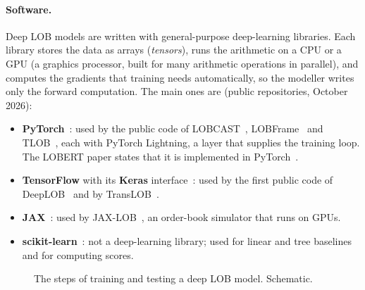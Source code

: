 \paragraph{Software.} Deep LOB models are written with general-purpose deep-learning libraries. Each library
stores the data as arrays (\emph{tensors}), runs the arithmetic on a CPU or a GPU (a graphics processor, built for many arithmetic operations in parallel), and computes the gradients that
training needs automatically, so the modeller writes only the forward computation. The main ones are
(public repositories, October 2026):
\begin{itemize}[leftmargin=1.5em,itemsep=1pt]
\item \textbf{PyTorch}~\citep{paszke2019pytorch}: used by the public code of LOBCAST~\citep{prata2024},
  LOBFrame~\citep{briola2024} and TLOB~\citep{berti2025tlob}, each with PyTorch Lightning, a layer that supplies the
  training loop. The LOBERT paper states that it is implemented in PyTorch~\citep{linna2025lobert}.
\item \textbf{TensorFlow} with its \textbf{Keras} interface~\citep{abadi2016tensorflow,chollet2015keras}: used by the
  first public code of DeepLOB~\citep{zhang2019} and by
  TransLOB~\citep{wallbridge2020}.
\item \textbf{JAX}~\citep{bradbury2018jax}: used by JAX-LOB~\citep{frey2023}, an order-book simulator that runs on GPUs.
\item \textbf{scikit-learn}~\citep{pedregosa2011sklearn}: not a deep-learning library; used for linear and tree
  baselines and for computing scores.
\end{itemize}

\begin{figure}[!htbp]
\centering
{}
\caption{The steps of training and testing a deep LOB model. Schematic.}
\label{fig:deep-train}
\end{figure}

